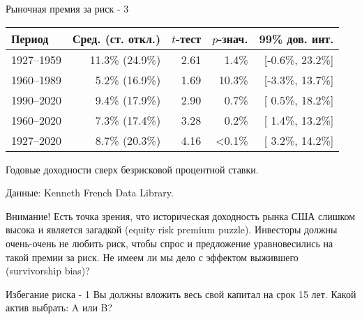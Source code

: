 \documentclass{beamer}
\begin{document}
\begin{frame}{Рыночная премия за риск - 3}
\centering
\begin{tabular}{l|r|r|r|r}
Период & Сред. (ст. откл.) & $t$-тест & $p$-знач. & 99\% дов. инт. \\
\hline
1927--1959 & 11.3\% (24.9\%) & 2.61 &  1.4\% & [-0.6\%, 23.2\%] \\
1960--1989 &  5.2\% (16.9\%) & 1.69 & 10.3\% & [-3.3\%, 13.7\%] \\
1990--2020 &  9.4\% (17.9\%) & 2.90 &  0.7\% & [ 0.5\%, 18.2\%] \\
1960--2020 &  7.3\% (17.4\%) & 3.28 &  0.2\% & [ 1.4\%, 13.2\%] \\ \hline
1927--2020 &  8.7\% (20.3\%) & 4.16 & <0.1\% & [ 3.2\%, 14.2\%] 
\end{tabular}
{\scriptsize Годовые доходности сверх безрисковой процентной ставки.

Данные: Kenneth French Data Library. \par }

\justify
Внимание! Есть точка зрения, что историческая доходность рынка США слишком высока и является загадкой (equity risk premium puzzle). Инвесторы должны очень-очень не любить риск, чтобы спрос и предложение уравновесились на такой премии за риск. Не имеем ли мы дело с эффектом выжившего (survivorship bias)?
\end{frame}



\begin{frame}{Избегание риска - 1}
\justify
Вы должны вложить весь свой капитал на срок 15 лет. Какой актив выбрать: A или B?

\centering
{}
\end{frame}
\end{document}
